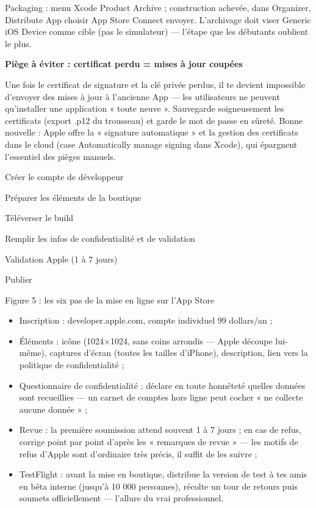 Packaging : menu Xcode Product Archive ; construction achevée, dans Organizer, Distribute App choisir App Store Connect envoyer. L'archivage doit viser Generic iOS Device comme cible (pas le simulateur) — l'étape que les débutants oublient le plus.

\textbf{Piège à éviter : certificat perdu = mises à jour coupées}\par

Une fois le certificat de signature et la clé privée perdus, il te devient impossible d'envoyer des mises à jour à l'ancienne App — les utilisateurs ne peuvent qu'installer une application « toute neuve ». Sauvegarde soigneusement les certificats (export .p12 du trousseau) et garde le mot de passe en sûreté. Bonne nouvelle : Apple offre la « signature automatique » et la gestion des certificats dans le cloud (case Automatically manage signing dans Xcode), qui épargnent l'essentiel des pièges manuels.


Créer le compte de développeur

Préparer les éléments de la boutique

Téléverser le build

Remplir les infos de confidentialité et de validation

Validation Apple (1 à 7 jours)

Publier

\begin{center}\small\color{gray}Figure 5 : les six pas de la mise en ligne sur l'App Store\end{center}

\begin{itemize}
  \item Inscription : developer.apple.com, compte individuel 99 dollars/an ;
  \item Éléments : icône (1024×1024, sans coins arrondis — Apple découpe lui-même), captures d'écran (toutes les tailles d'iPhone), description, lien vers la politique de confidentialité ;
  \item Questionnaire de confidentialité : déclare en toute honnêteté quelles données sont recueillies — un carnet de comptes hors ligne peut cocher « ne collecte aucune donnée » ;
  \item Revue : la première soumission attend souvent 1 à 7 jours ; en cas de refus, corrige point par point d'après les « remarques de revue » — les motifs de refus d'Apple sont d'ordinaire très précis, il suffit de les suivre ;
  \item TestFlight : avant la mise en boutique, distribue la version de test à tes amis en bêta interne (jusqu'à 10 000 personnes), récolte un tour de retours puis soumets officiellement — l'allure du vrai professionnel.
\end{itemize}

